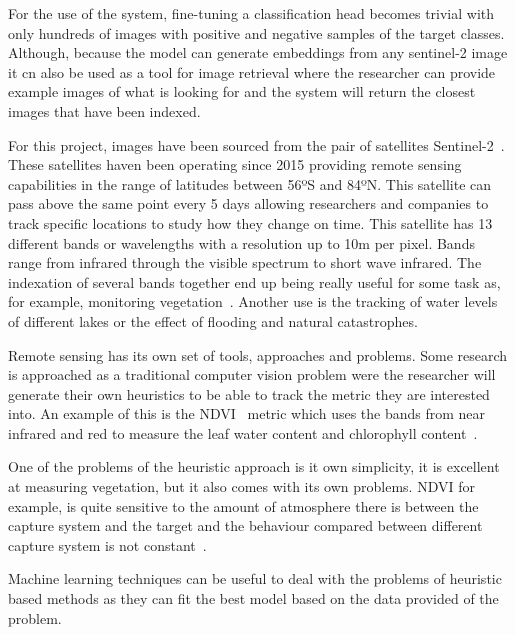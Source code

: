 \documentclass[conference]{IEEEtran}
\begin{document}
    For the use of the system, fine-tuning a classification head becomes trivial with only hundreds of images with positive and negative
    samples of the target classes.
    Although, because the model can generate embeddings from any sentinel-2 image it cn also be used as a tool for image retrieval
    where the researcher can provide example images of what is looking for and the system will return the closest images that
    have been indexed.

    For this project, images have been sourced from the pair of satellites Sentinel-2~\cite{sentinel-2}.
    These satellites haven been operating since 2015 providing remote sensing capabilities in the range of latitudes between 56ºS and 84ºN\@.
    This satellite can pass above the same point every 5 days allowing researchers and companies to track specific locations
    to study how they change on time.
    This satellite has 13 different bands or wavelengths with a resolution up to 10m per pixel.
    Bands range from infrared through the visible spectrum to short wave infrared.
    The indexation of several bands together end up being really useful for some task as, for example, monitoring vegetation~\cite{TUCKER1979127}.
    Another use is the tracking of water levels of different lakes or the effect of flooding and natural catastrophes.

    Remote sensing has its own set of tools, approaches and problems.
    Some research is approached as a traditional computer vision problem were the researcher will
    generate their own heuristics to be able to track the metric they are interested into.
    An example of this is the NDVI~\cite{NDVIsource} metric which uses the bands from near infrared and red to
    measure the leaf water content and chlorophyll content~\cite{TUCKER1979127}.

    One of the problems of the heuristic approach is it own simplicity, it is excellent at measuring
    vegetation, but it also comes with its own problems.
    NDVI for example, is quite sensitive to the amount of atmosphere there is between the capture system and the target and
    the behaviour compared between different capture system is not constant~\cite{Huang2021}.

    Machine learning techniques can be useful to deal with the problems of heuristic based methods as they can fit the best model
    based on the data provided of the problem.
\end{document}
